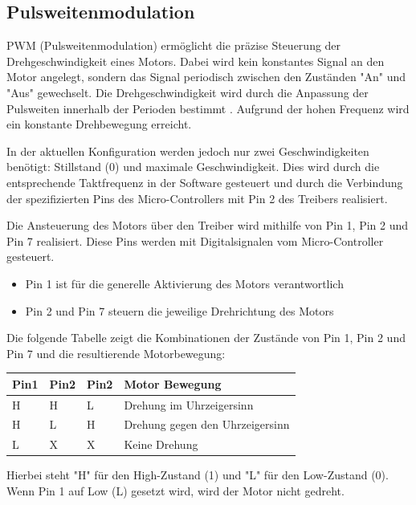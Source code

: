 \documentclass[conference,compsoc,final,a4paper]{IEEEtran}
\begin{document}
\subsection{Pulsweitenmodulation}

PWM (Pulsweitenmodulation) ermöglicht die präzise Steuerung der Drehgeschwindigkeit eines Motors. Dabei wird kein konstantes Signal an den Motor angelegt,
sondern das Signal periodisch zwischen den Zuständen "An" und "Aus" gewechselt. Die Drehgeschwindigkeit wird durch die Anpassung der Pulsweiten innerhalb der Perioden 
bestimmt \autocite{611797}. Aufgrund der hohen Frequenz wird ein konstante Drehbewegung erreicht. 

In der aktuellen Konfiguration werden jedoch nur zwei Geschwindigkeiten benötigt: Stillstand (0) und maximale Geschwindigkeit. 
Dies wird durch die entsprechende Taktfrequenz in der Software gesteuert und durch die Verbindung der 
spezifizierten Pins des Micro-Controllers mit Pin 2 des Treibers realisiert.

Die Ansteuerung des Motors über den Treiber wird mithilfe von Pin 1, Pin 2 und Pin 7 realisiert. 
Diese Pins werden mit Digitalsignalen vom Micro-Controller gesteuert.
\begin{itemize}
  \item Pin 1 ist für die generelle Aktivierung des Motors verantwortlich
  \item Pin 2 und Pin 7 steuern die jeweilige Drehrichtung des Motors
\end{itemize}

Die folgende Tabelle zeigt die Kombinationen der Zustände von Pin 1, Pin 2 und Pin 7 und die resultierende Motorbewegung:

\begin{table}[]
  \begin{tabular}{llll}
  \hline
  \textbf{Pin1} & \textbf{Pin2} & \textbf{Pin2} & \textbf{Motor Bewegung}         \\ \hline
  H             & H             & L             & Drehung im Uhrzeigersinn        \\
  H             & L             & H             & Drehung gegen den Uhrzeigersinn \\
  L             & X             & X             & Keine Drehung                   \\ \hline
  \end{tabular}
\end{table}

Hierbei steht "H" für den High-Zustand (1) und "L" für den Low-Zustand (0). Wenn Pin 1 auf Low (L) gesetzt wird, wird der Motor nicht gedreht.
\end{document}
